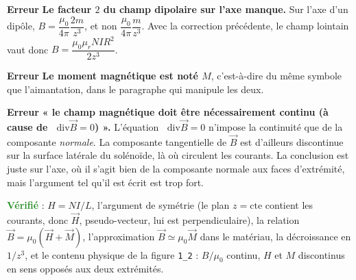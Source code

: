 \documentclass[a4paper,11pt]{article}
\newcommand*\diver{\mathop{}\!\mathrm{div}}
\newcommand{\erreur}{\textcolor{BrickRed}{\textbf{Erreur}}}
\newcommand{\verifie}{\textcolor{ForestGreen}{\textbf{Vérifié}}}
\begin{document}
\medskip
\erreur{} \textbf{Le facteur $2$ du champ dipolaire sur l'axe manque.} Sur l'axe d'un dipôle,
$B=\dfrac{\mu_0}{4\pi}\dfrac{2m}{z^3}$, et non $\dfrac{\mu_0}{4\pi}\dfrac{m}{z^3}$. Avec la correction
précédente, le champ lointain vaut donc $B=\dfrac{\mu_0\mu_r NIR^2}{2z^3}$.

\medskip
\erreur{} \textbf{Le moment magnétique est noté $M$}, c'est-à-dire du même symbole que l'aimantation,
dans le paragraphe qui manipule les deux.

\medskip
\erreur{} \textbf{« le champ magnétique doit être nécessairement continu (à cause de $\diver\vec B=0$) ».}
L'équation $\diver\vec B=0$ n'impose la continuité que de la composante \textit{normale}. La composante
tangentielle de $\vec B$ est d'ailleurs discontinue sur la surface latérale du solénoïde, là où
circulent les courants. La conclusion est juste sur l'axe, où il s'agit bien de la composante normale
aux faces d'extrémité, mais l'argument tel qu'il est écrit est trop fort.

\medskip
\verifie{} : $H=NI/L$, l'argument de symétrie (le plan $z=\mathrm{cte}$ contient les courants, donc
$\vec H$, pseudo-vecteur, lui est perpendiculaire), la relation $\vec B=\mu_0(\vec H+\vec M)$,
l'approximation $\vec B\simeq\mu_0\vec M$ dans le matériau, la décroissance en $1/z^3$, et le contenu
physique de la figure \texttt{1\_2} : $B/\mu_0$ continu, $H$ et $M$ discontinus en sens opposés aux
deux extrémités.
\end{document}
